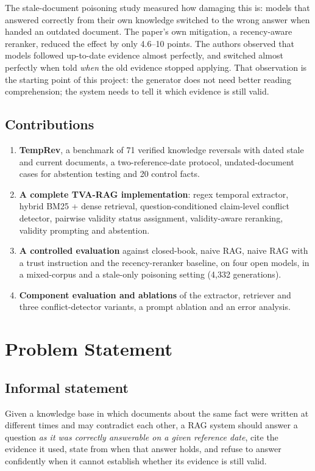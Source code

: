\documentclass[11pt,a4paper]{report}
\begin{document}
The stale-document poisoning study \cite{stale} measured how damaging this is: models that answered correctly from their own knowledge switched to the wrong answer when handed an outdated document. The paper's own mitigation, a recency-aware reranker, reduced the effect by only 4.6--10 points. The authors observed that models followed up-to-date evidence almost perfectly, and switched almost perfectly when told \emph{when} the old evidence stopped applying. That observation is the starting point of this project: the generator does not need better reading comprehension; the system needs to tell it which evidence is still valid.

\section{Contributions}
\begin{enumerate}[leftmargin=1.6em]
  \item \textbf{TempRev}, a benchmark of 71 verified knowledge reversals with dated stale and current documents, a two-reference-date protocol, undated-document cases for abstention testing and 20 control facts.
  \item \textbf{A complete TVA-RAG implementation}: regex temporal extractor, hybrid BM25 + dense retrieval, question-conditioned claim-level conflict detector, pairwise validity status assignment, validity-aware reranking, validity prompting and abstention.
  \item \textbf{A controlled evaluation} against closed-book, naive RAG, naive RAG with a trust instruction and the recency-reranker baseline, on four open models, in a mixed-corpus and a stale-only poisoning setting (4,332 generations).
  \item \textbf{Component evaluation and ablations} of the extractor, retriever and three conflict-detector variants, a prompt ablation and an error analysis.
\end{enumerate}

\chapter{Problem Statement}
\section{Informal statement}
Given a knowledge base in which documents about the same fact were written at different times and may contradict each other, a RAG system should answer a question \emph{as it was correctly answerable on a given reference date}, cite the evidence it used, state from when that answer holds, and refuse to answer confidently when it cannot establish whether its evidence is still valid.
\end{document}

